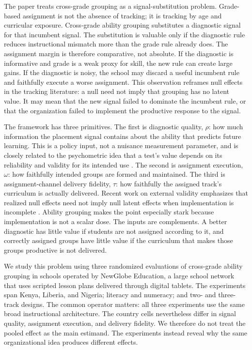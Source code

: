 \documentclass[11pt]{article}
\begin{document}
The paper treats cross-grade grouping as a signal-substitution problem. Grade-based assignment is not the absence of tracking; it is tracking by age and curricular exposure. Cross-grade ability grouping substitutes a diagnostic signal for that incumbent signal. The substitution is valuable only if the diagnostic rule reduces instructional mismatch more than the grade rule already does. The assignment margin is therefore comparative, not absolute. If the diagnostic is informative and grade is a weak proxy for skill, the new rule can create large gains. If the diagnostic is noisy, the school may discard a useful incumbent rule and faithfully execute a worse assignment. This observation reframes null effects in the tracking literature: a null need not imply that grouping has no latent value. It may mean that the new signal failed to dominate the incumbent rule, or that the organization failed to implement the productive response to the signal.

The framework has three primitives. The first is diagnostic quality, $\rho$: how much information the placement signal contains about the ability that predicts future learning. This is a policy input, not a nuisance measurement parameter, and is closely related to the psychometric idea that a test's value depends on its reliability and validity for its intended use \citep{lordnovick1968,cronbachmeehl1955}. The second is assignment execution, $\omega$: how faithfully intended groups are formed and maintained. The third is assignment-channel delivery fidelity, $\tau$: how faithfully the assigned track's curriculum is actually delivered. Recent work on external validity emphasizes that realized null effects need not imply null latent effects when implementation is incomplete \citep{angristmeager2023}. Ability grouping makes the point especially stark because implementation is not a scalar dose. The inputs are complements. A better diagnostic has little value if students are not assigned according to it, and correctly assigned groups have little value if the curriculum that makes those groups productive is not delivered.

We study this problem using three randomized evaluations of cross-grade ability grouping in schools operated by NewGlobe Education, a large school network that uses scripted lesson plans delivered through digital tablets. The experiments span Kenya, Liberia, and Nigeria; literacy and numeracy; and two- and three-track designs. The common operator matters: all three experiments use the same broad instructional architecture. The country cells nevertheless differ in signal quality, assignment execution, and delivery fidelity. We therefore do not treat the pooled effect as the main estimand. The experiments instead reveal why the same organizational idea produces different effects.
\end{document}
